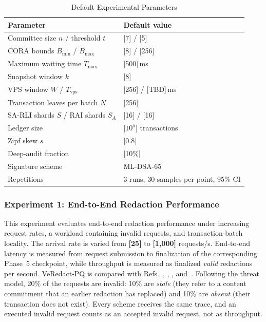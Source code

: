 \documentclass[lettersize,journal]{IEEEtran}
\begin{document}
\begin{table}[t]
\centering
\caption{Default Experimental Parameters}
\label{tab:params}
\scriptsize
\renewcommand{\arraystretch}{1.08}
\setlength{\tabcolsep}{4pt}
\begin{tabular}{ll}
\hline
\textbf{Parameter} & \textbf{Default value} \\
\hline
Committee size $n$ / threshold $t$ & [7] / [5] \\
CORA bounds $B_{\min}$ / $B_{\max}$ & [8] / [256] \\
Maximum waiting time $T_{\max}$ & [500]\,ms \\
\textcolor{e1}{Snapshot window $k$} & \textcolor{e1}{[8]} \\
\textcolor{e2}{VPS window $W$ / $T_{\mathrm{vps}}$} & \textcolor{e2}{[256] / [TBD]\,ms} \\
Transaction leaves per batch $N$ & [256] \\
SA-RLI shards $S$ / RAI shards $S_A$ & [16] / [16] \\
Ledger size & [$10^5$] transactions \\
Zipf skew $s$ & [0.8] \\
Deep-audit fraction & [10\%] \\
Signature scheme & ML-DSA-65 \\
Repetitions & 3 runs, 30 samples per point, 95\% CI \\
\hline
\end{tabular}
\end{table}

    
\subsubsection*{\textbf{Experiment 1: End-to-End Redaction Performance}}

This experiment evaluates end-to-end redaction performance under
increasing request rates\textcolor{e1}{, a workload containing invalid
requests,} and transaction-batch locality. The arrival
rate is varied from \textcolor{e1}{\textbf{[25]} to \textbf{[1,000]}}
requests/s.
End-to-end latency is measured from request submission to finalization
of the corresponding Phase~5 checkpoint, while throughput is measured
as \textcolor{e1}{finalized \emph{valid} redactions per second}.
VeRedact-PQ is compared with
Refs.~\cite{ref1}, \cite{ref13}, \cite{ref27}, and~\cite{ref34}.
\textcolor{e1}{Following the threat model, 20\% of the requests are
invalid: 10\% are \emph{stale} (they refer to a content commitment that
an earlier redaction has replaced) and 10\% are \emph{absent} (their
transaction does not exist). Every scheme receives the same trace, and
an executed invalid request counts as an accepted invalid request, not
as throughput.}
\end{document}
